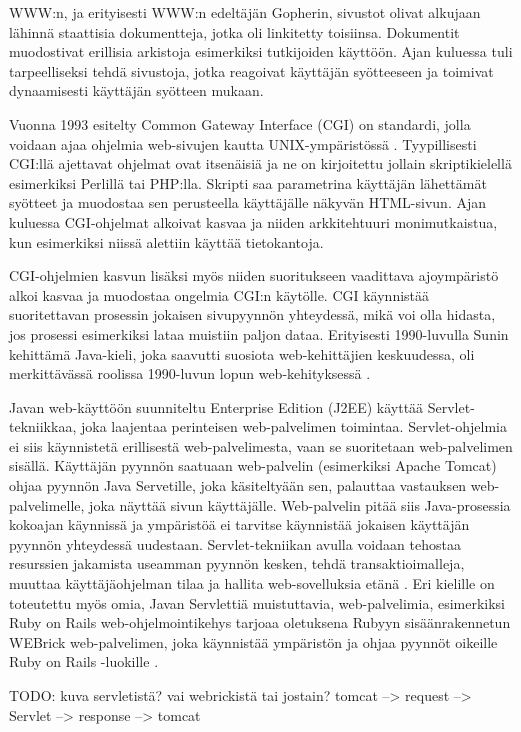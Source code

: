 WWW:n, ja erityisesti WWW:n edeltäjän Gopherin, sivustot olivat alkujaan lähinnä staattisia dokumentteja, jotka oli linkitetty toisiinsa. Dokumentit muodostivat erillisia arkistoja esimerkiksi tutkijoiden käyttöön. Ajan kuluessa tuli tarpeelliseksi tehdä sivustoja, jotka reagoivat käyttäjän syötteeseen ja toimivat dynaamisesti käyttäjän syötteen mukaan.

Vuonna 1993 esitelty Common Gateway Interface (CGI) on standardi, jolla voidaan ajaa ohjelmia web-sivujen kautta UNIX-ympäristössä \cite{rfc3875}. Tyypillisesti CGI:llä ajettavat ohjelmat ovat itsenäisiä ja ne on kirjoitettu jollain skriptikielellä esimerkiksi Perlillä tai PHP:lla. Skripti saa parametrina käyttäjän lähettämät syötteet ja muodostaa sen perusteella käyttäjälle näkyvän HTML-sivun. Ajan kuluessa CGI-ohjelmat alkoivat kasvaa ja niiden arkkitehtuuri monimutkaistua, kun esimerkiksi niissä alettiin käyttää tietokantoja.

CGI-ohjelmien kasvun lisäksi myös niiden suoritukseen vaadittava ajoympäristö alkoi kasvaa ja muodostaa ongelmia CGI:n käytölle. CGI käynnistää suoritettavan prosessin jokaisen sivupyynnön yhteydessä, mikä voi olla hidasta, jos prosessi esimerkiksi lataa muistiin paljon dataa. Erityisesti 1990-luvulla Sunin kehittämä Java-kieli, joka saavutti suosiota web-kehittäjien keskuudessa, oli merkittävässä roolissa 1990-luvun lopun web-kehityksessä \cite{uml}.

Javan web-käyttöön suunniteltu Enterprise Edition (J2EE) käyttää Servlet-tekniikkaa, joka laajentaa perinteisen web-palvelimen toimintaa. Servlet-ohjelmia ei siis käynnistetä erillisestä web-palvelimesta, vaan se suoritetaan web-palvelimen sisällä. Käyttäjän pyynnön saatuaan web-palvelin (esimerkiksi Apache Tomcat) ohjaa pyynnön Java Servetille, joka käsiteltyään sen, palauttaa vastauksen web-palvelimelle, joka näyttää sivun käyttäjälle. Web-palvelin pitää siis Java-prosessia kokoajan käynnissä ja ympäristöä ei tarvitse käynnistää jokaisen käyttäjän pyynnön yhteydessä uudestaan. Servlet-tekniikan avulla voidaan tehostaa resurssien jakamista useamman pyynnön kesken, tehdä transaktioimalleja, muuttaa käyttäjäohjelman tilaa ja hallita web-sovelluksia etänä \cite{uml}. Eri kielille on toteutettu myös omia, Javan Servlettiä muistuttavia, web-palvelimia, esimerkiksi Ruby on Rails web-ohjelmointikehys tarjoaa oletuksena Rubyyn sisäänrakennetun WEBrick web-palvelimen, joka käynnistää ympäristön ja ohjaa pyynnöt oikeille Ruby on Rails -luokille \cite{ruby2011agile}.

TODO: kuva servletistä? vai webrickistä tai jostain? tomcat --> request --> Servlet --> response --> tomcat

